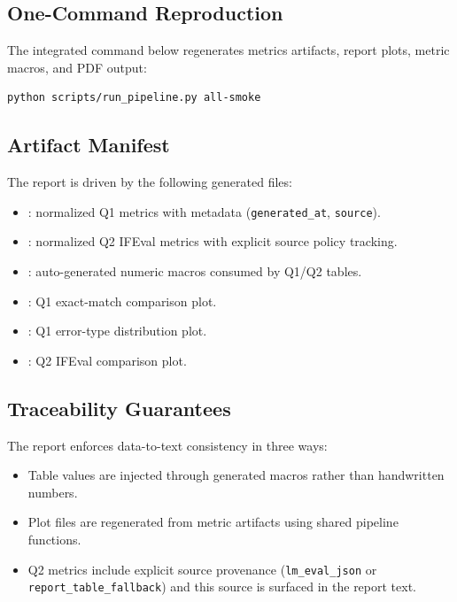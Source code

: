 \documentclass[conference]{IEEEtran}
\begin{document}
\subsection{One-Command Reproduction}
The integrated command below regenerates metrics artifacts, report plots, metric macros, and PDF output:
\begin{lstlisting}[language=bash]
python scripts/run_pipeline.py all-smoke
\end{lstlisting}

\subsection{Artifact Manifest}
The report is driven by the following generated files:
\begin{itemize}
    \item {}: normalized Q1 metrics with metadata (\texttt{generated\_at}, \texttt{source}).
    \item {}: normalized Q2 IFEval metrics with explicit source policy tracking.
    \item {}: auto-generated numeric macros consumed by Q1/Q2 tables.
    \item {}: Q1 exact-match comparison plot.
    \item {}: Q1 error-type distribution plot.
    \item {}: Q2 IFEval comparison plot.
\end{itemize}

\subsection{Traceability Guarantees}
The report enforces data-to-text consistency in three ways:
\begin{itemize}
    \item Table values are injected through generated macros rather than handwritten numbers.
    \item Plot files are regenerated from metric artifacts using shared pipeline functions.
    \item Q2 metrics include explicit source provenance (\texttt{lm\_eval\_json} or \texttt{report\_table\_fallback}) and this source is surfaced in the report text.
\end{itemize}
\end{document}

